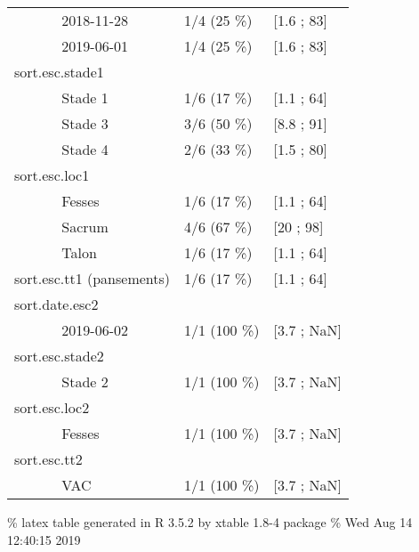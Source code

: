 \documentclass[]{article}
\begin{document}
\begin{longtable}{lll}
  ~~~~~~ 2018-11-28 & 1/4 (25 \%) &  [1.6 ; 83] \\ 
  ~~~~~~ 2019-06-01 & 1/4 (25 \%) &  [1.6 ; 83] \\ 
  sort.esc.stade1 &   &   \\ 
  ~~~~~~ Stade 1 & 1/6 (17 \%) &  [1.1 ; 64] \\ 
  ~~~~~~ Stade 3 & 3/6 (50 \%) &  [8.8 ; 91] \\ 
  ~~~~~~ Stade 4 & 2/6 (33 \%) &  [1.5 ; 80] \\ 
  sort.esc.loc1 &   &   \\ 
  ~~~~~~ Fesses & 1/6 (17 \%) &  [1.1 ; 64] \\ 
  ~~~~~~ Sacrum & 4/6 (67 \%) &  [20 ; 98] \\ 
  ~~~~~~ Talon & 1/6 (17 \%) &  [1.1 ; 64] \\ 
  sort.esc.tt1 (pansements) & 1/6 (17 \%) &  [1.1 ; 64] \\ 
  sort.date.esc2 &   &   \\ 
  ~~~~~~ 2019-06-02 & 1/1 (100 \%) &  [3.7 ; NaN] \\ 
  sort.esc.stade2 &   &   \\ 
  ~~~~~~ Stade 2 & 1/1 (100 \%) &  [3.7 ; NaN] \\ 
  sort.esc.loc2 &   &   \\ 
  ~~~~~~ Fesses & 1/1 (100 \%) &  [3.7 ; NaN] \\ 
  sort.esc.tt2 &   &   \\ 
  ~~~~~~ VAC & 1/1 (100 \%) &  [3.7 ; NaN] \\ 
  \end{longtable}

\% latex table generated in R 3.5.2 by xtable 1.8-4 package \% Wed Aug
14 12:40:15 2019
\end{document}
